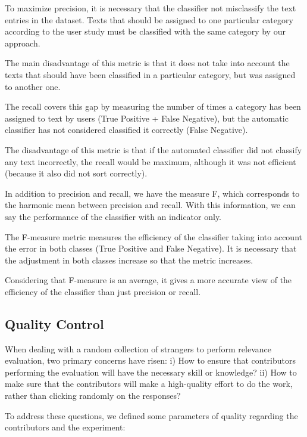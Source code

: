 To maximize precision, it is necessary that the classifier not misclassify the text entries in the dataset. Texts that should be assigned to one particular category according to the user study must be classified with the same category by our approach.

The main disadvantage of this metric is that it does not take into account the texts that should have been classified in a particular category, but was assigned to another one.

The recall covers this gap by measuring the number of times a category has been assigned to text by users (True Positive + False Negative), but the automatic classifier has not considered classified it correctly (False Negative).

The disadvantage of this metric is that if the automated classifier did not classify any text incorrectly, the recall would be maximum, although it was not efficient (because it also did not sort correctly).

In addition to precision and recall, we have the measure F, which corresponds to the harmonic mean between precision and recall. With this information, we can say the performance of the classifier with an indicator only.

The F-measure metric measures the efficiency of the classifier taking into account the error in both classes (True Positive and False Negative). It is necessary that the adjustment in both classes increase so that the metric increases. 

Considering that F-measure is an average, it gives a more accurate view of the efficiency of the classifier than just precision or recall.

\subsection{\hspace*{3pt} Quality Control}

When dealing with a random collection of strangers to perform relevance evaluation, two primary concerns have risen:  i) How to ensure that contributors performing the evaluation will have the necessary skill or knowledge? ii) How to make sure that the contributors will make a high-quality effort to do the work, rather than clicking randomly on the responses?


To address these questions, we defined some parameters of quality regarding the contributors and the experiment:

